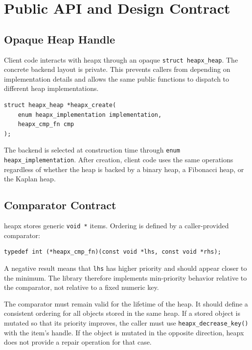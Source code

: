 \chapter{Public API and Design Contract}

\section{Opaque Heap Handle}

Client code interacts with heapx through an opaque \texttt{struct heapx\_heap}.
The concrete backend layout is private.
This prevents callers from depending on implementation details and allows the same public functions to dispatch to different heap implementations.

\begin{lstlisting}[style=cstyle, caption={Creating a heap through the public API.}]
struct heapx_heap *heapx_create(
    enum heapx_implementation implementation,
    heapx_cmp_fn cmp
);
\end{lstlisting}

The backend is selected at construction time through \texttt{enum heapx\_implementation}.
After creation, client code uses the same operations regardless of whether the heap is backed by a binary heap, a Fibonacci heap, or the Kaplan heap.

\section{Comparator Contract}

heapx stores generic \texttt{void *} items.
Ordering is defined by a caller-provided comparator:

\begin{lstlisting}[style=cstyle, caption={Comparator type.}]
typedef int (*heapx_cmp_fn)(const void *lhs, const void *rhs);
\end{lstlisting}

A negative result means that \texttt{lhs} has higher priority and should appear closer to the minimum.
The library therefore implements min-priority behavior relative to the comparator, not relative to a fixed numeric key.

The comparator must remain valid for the lifetime of the heap.
It should define a consistent ordering for all objects stored in the same heap.
If a stored object is mutated so that its priority improves, the caller must use \texttt{heapx\_decrease\_key()} with the item's handle.
If the object is mutated in the opposite direction, heapx does not provide a repair operation for that case.

